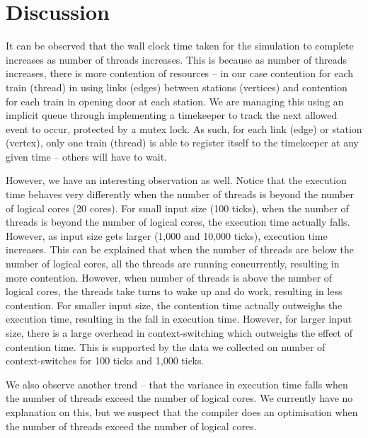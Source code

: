 \documentclass[a4paper,12pt]{article}
\begin{document}
	\section{Discussion}
	It can be observed that the wall clock time taken for the simulation to complete increases as number of threads increases. This is because as number of threads increases, there is more contention of resources -- in our case contention for each train (thread) in using links (edges) between stations (vertices) and contention for each train in opening door at each station. We are managing this using an implicit queue through implementing a timekeeper to track the next allowed event to occur, protected by a mutex lock. As such, for each link (edge) or station (vertex), only one train (thread) is able to register itself to the timekeeper at any given time -- others will have to wait.
	
	However, we have an interesting observation as well. Notice that the execution time behaves very differently when the number of threads is beyond the number of logical cores (20 cores). For small input size (100 ticks), when the number of threads is beyond the number of logical cores, the execution time actually falls. However, as input size gets larger (1,000 and 10,000 ticks), execution time increases. This can be explained that when the number of threads are below the number of logical cores, all the threads are running concurrently, resulting in more contention. However, when number of threads is above the number of logical cores, the threads take turns to wake up and do work, resulting in less contention. For smaller input size, the contention time actually outweighs the execution time, resulting in the fall in execution time. However, for larger input size, there is a large overhead in context-switching which outweighs the effect of contention time. This is supported by the data we collected on number of context-switches for 100 ticks and 1,000 ticks.
	
	We also observe another trend -- that the variance in execution time falls when the number of threads exceed the number of logical cores. We currently have no explanation on this, but we suspect that the compiler does an optimisation when the number of threads exceed the number of logical cores.
	
\end{document}
